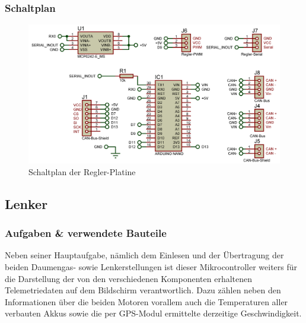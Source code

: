 \subsubsection{Schaltplan}
\begin{figure}[h]
    \centering
    \includegraphics[width=1.0\textwidth]{../Proteus/Exports/Regler-Platine.png}    
    \caption{Schaltplan der Regler-Platine}
\end{figure}

\newpage
\subsection{Lenker}
\subsubsection{Aufgaben \& verwendete Bauteile}
Neben seiner Hauptaufgabe, nämlich dem Einlesen und der Übertragung der beiden Daumengas- sowie Lenkerstellungen ist dieser Mikrocontroller weiters für die Darstellung der von den verschiedenen Komponenten erhaltenen Telemetriedaten auf dem Bildschirm verantwortlich.
Dazu zählen neben den Informationen über die beiden Motoren vorallem auch die Temperaturen aller verbauten Akkus sowie die per GPS-Modul ermittelte derzeitige Geschwindigkeit.

